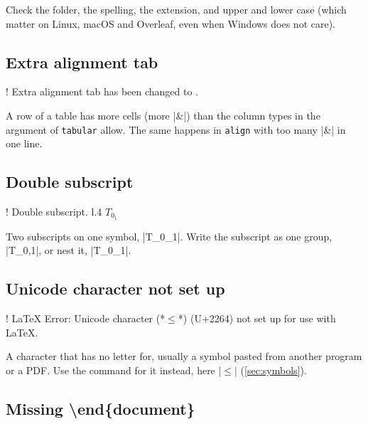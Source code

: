 Check the folder, the spelling, the extension, and upper and lower case
(which matter on Linux, macOS and Overleaf, even when Windows does not care).

\subsection*{Extra alignment tab}

\begin{codeblock}[style=shell]
! Extra alignment tab has been changed to \cr.
\end{codeblock}

A row of a table has more cells (more \code|&|) than the column types in the argument of \texttt{tabular} allow.
The same happens in \texttt{align} with too many \code|&| in one line.

\subsection*{Double subscript}

\begin{codeblock}[style=shell]
! Double subscript.
l.4 $T_0_
         1$
\end{codeblock}

Two subscripts on one symbol, \code|T_0_1|.
Write the subscript as one group, \code|T_{0,1}|, or nest it, \code|T_{0_1}|.

\subsection*{Unicode character not set up}

\begin{codeblock}[style=shell]
! LaTeX Error: Unicode character (*$\leq$*) (U+2264)
               not set up for use with LaTeX.
\end{codeblock}

A character that  has no letter for, usually a symbol pasted from another program or a PDF.
Use the command for it instead, here \code|$\leq$| (\autoref{sec:symbols}).

\subsection*{Missing \textbackslash end\{document\}}



